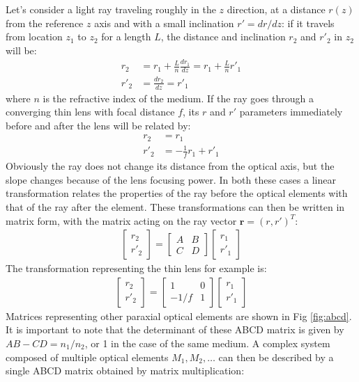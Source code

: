 Let's consider a light ray traveling roughly in the $z$ direction, at a distance $r(z)$ from the reference $z$ axis and with a small inclination $r'=dr/dz$: if it travels from  location $z_1$ to $z_2$ for a length $L$, the distance and inclination $r_2$ and $r'_2$ in $z_2$ will be:
\begin{align}
r_2 &= r_1 + \frac{L}{n}\frac{dr_1}{dz} = r_1 + \frac{L}{n}r'_1  \\
r'_2 &= \frac{dr_2}{dz} = r'_1
\end{align}
where $n$ is the refractive index of the medium.
If the ray goes through a converging thin lens with focal distance $f$, its $r$ and $r'$ parameters immediately before and after the lens will be related by:
\begin{align}
r_2 &= r_1 \\
r'_2 &= -\frac{1}{f}r_1 +r'_1
\end{align}
Obviously the ray does not change its distance from the optical axis, but the slope changes because of the lens focusing power.
In both these cases a linear transformation relates the properties of the ray before the optical elements with that of the ray after the element. These transformations can then be written in matrix form, with the matrix acting on the ray vector $\boldsymbol{r} = (r,r')^T$:
\begin{align}
\begin{bmatrix}
	r_2 \\
	r'_2
\end{bmatrix}
=
\begin{bmatrix}
	A & B\\
	C & D
\end{bmatrix}
\begin{bmatrix}
	r_1 \\
	r'_1
\end{bmatrix}
\end{align}
The transformation representing the thin lens for example is:
\begin{align*}
\begin{bmatrix}
r_2 \\
r'_2
\end{bmatrix}
=
\begin{bmatrix}
1 & 0\\
-1/f & 1
\end{bmatrix}
\begin{bmatrix}
r_1 \\
r'_1
\end{bmatrix}
\end{align*}
Matrices representing other paraxial optical elements are shown in Fig \ref{fig:abcd}. It is important to note that the determinant of these ABCD matrix is given by $AB-CD=n_1/n_2$, or 1 in the case of the same medium. A complex system composed of multiple optical elements $M_1,M_2,\dots$ can then be described by a single ABCD matrix obtained by matrix multiplication:
